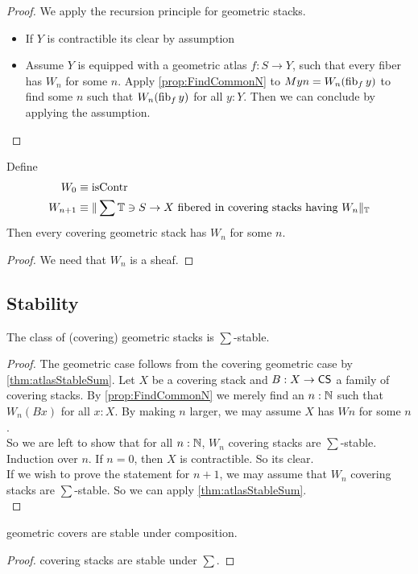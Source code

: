 \begin{proof}
		We apply the recursion principle for geometric stacks.
	\begin{itemize}
		\item If $Y$ is contractible its clear by assumption
		\item Assume $Y$ is equipped with a geometric atlas $f : S \to Y$, such that every fiber has $W_n$ for some $n$. Apply \ref{prop:FindCommonN} to $M y n = W_n (\operatorname{fib}_f y)$ to find some $n$ such that $W_n (\operatorname{fib}_f y)$ for all $y : Y$.
		Then we can conclude by applying the assumption.
	
	\end{itemize}
\end{proof}


\begin{corollary}
	Define \begin{align*}
		W_0 &\equiv \operatorname{isContr} \\
		W_{n+1} &\equiv \| \sum \mathbb{T} \ni S \to X \text{ fibered in covering stacks having } W_n \|_{\mathbb{T}}
	\end{align*}
	Then every covering geometric stack has $W_n$ for some $n$.
\end{corollary}
\begin{proof}
	We need that $W_n$ is a sheaf.
\end{proof}
\subsection{Stability}
\begin{theorem}{\label{thm:CSSum}}
	The class of (covering) geometric stacks is $\sum$-stable.
\end{theorem}
\begin{proof}
	The geometric case follows from the covering geometric case by \ref{thm:atlasStableSum}.
	Let $X$ be a covering stack and $B : X \to \mathsf{CS}$ a family of covering stacks.
	By \ref{prop:FindCommonN} we merely find an $n : \mathbb{N}$ such that $W_n (B x)$ for all $x : X$. By making $n$ larger, we may assume $X$ has $W n$ for some $n$. \\
	So we are left to show that for all $n : \mathbb{N}$, $W_n$ covering stacks are $\sum$-stable. \\
	
	
	Induction over $n$. If $n = 0$, then $X$ is contractible. So its clear. \\
	If we wish to prove the statement for $n+1$, we may assume that $W_n$ covering stacks are $\sum$-stable. So we can apply \ref{thm:atlasStableSum}. \\

\end{proof}
\begin{lemma}{\label{lemma:coversstableundercomp}}
	geometric covers are stable under composition.
\end{lemma}
\begin{proof}
	covering stacks are stable under $\sum$.
\end{proof}


